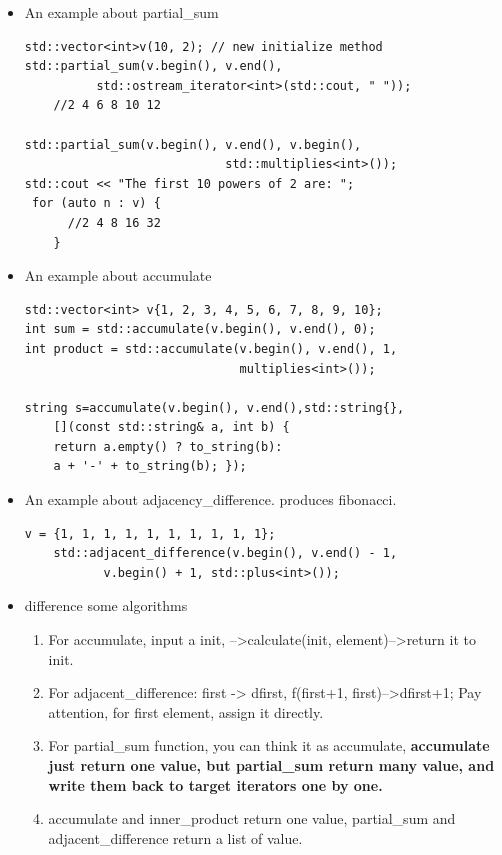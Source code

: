 \documentclass[a4paper,11pt,twoside]{book}
\begin{document}
\begin{itemize}

\item An example about partial\_sum

\begin{lstlisting}[numbers=none]
std::vector<int>v(10, 2); // new initialize method
std::partial_sum(v.begin(), v.end(),
          std::ostream_iterator<int>(std::cout, " "));
    //2 4 6 8 10 12

std::partial_sum(v.begin(), v.end(), v.begin(),
                            std::multiplies<int>());
std::cout << "The first 10 powers of 2 are: ";
 for (auto n : v) {
      //2 4 8 16 32
    }
\end{lstlisting}
\item An example about accumulate

\begin{lstlisting}[numbers=none]
std::vector<int> v{1, 2, 3, 4, 5, 6, 7, 8, 9, 10};
int sum = std::accumulate(v.begin(), v.end(), 0);
int product = std::accumulate(v.begin(), v.end(), 1,
                              multiplies<int>());

string s=accumulate(v.begin(), v.end(),std::string{},
    [](const std::string& a, int b) {
    return a.empty() ? to_string(b): 
    a + '-' + to_string(b); });
\end{lstlisting}

\item An example about adjacency\_difference. produces fibonacci.
\begin{lstlisting}[numbers=none]
 v = {1, 1, 1, 1, 1, 1, 1, 1, 1, 1};
    std::adjacent_difference(v.begin(), v.end() - 1,
           v.begin() + 1, std::plus<int>());

\end{lstlisting}

\item difference some algorithms
\begin{enumerate}
\item For accumulate, input a init, -->calculate(init, element)-->return it to init.
\item For adjacent\_difference:   first -> dfirst,  f(first+1, first)-->dfirst+1; Pay attention, for first element, assign it directly.
\item For partial\_sum function, you can think it as accumulate, \textbf{accumulate just return one value, but partial\_sum return many value, and write them back to target iterators one by one.  }
\item accumulate and inner\_product return one value, partial\_sum and adjacent\_difference return a list of value.
\end{enumerate}

\end{itemize}
\end{document}
